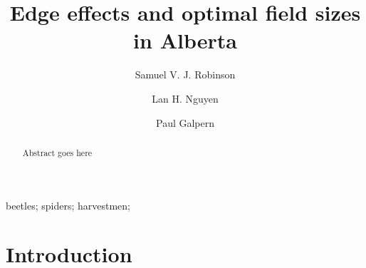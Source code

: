 \documentclass[]{elsarticle} %
\begin{document}
\begin{frontmatter}

  \title{Edge effects and optimal field sizes in Alberta}
    \author[University of Calgary]{Samuel V. J. Robinson}
    \author[University of Calgary]{Lan H. Nguyen}
    \author[University of Calgary]{Paul Galpern}
      \address[University of Calgary]{2500 University Drive NW, Calgary, AB}
  
  \begin{abstract}
  Abstract goes here
  \end{abstract}
   \begin{keyword} beetles; spiders; harvestmen;\end{keyword}
 \end{frontmatter}

\newpage
\doublespacing

\hypertarget{introduction}{%
\section{Introduction}\label{introduction}}
\end{document}
